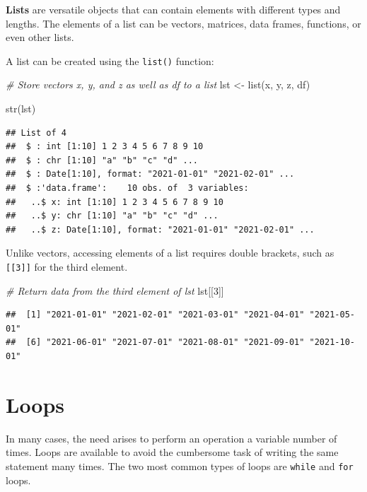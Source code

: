 \documentclass[
]{book}
\newenvironment{Shaded}{\begin{snugshade}}{\end{snugshade}}
\newcommand{\CommentTok}[1]{\textcolor[rgb]{0.56,0.35,0.01}{\textit{#1}}}
\newcommand{\DecValTok}[1]{\textcolor[rgb]{0.00,0.00,0.81}{#1}}
\newcommand{\FunctionTok}[1]{\textcolor[rgb]{0.00,0.00,0.00}{#1}}
\newcommand{\NormalTok}[1]{#1}
\newcommand{\OtherTok}[1]{\textcolor[rgb]{0.56,0.35,0.01}{#1}}
\begin{document}
\textbf{Lists} are versatile objects that can contain elements with different types and lengths. The elements of a list can be vectors, matrices, data frames, functions, or even other lists.

A list can be created using the \texttt{list()} function:

\begin{Shaded}
\begin{Highlighting}[]
\CommentTok{\# Store vectors x, y, and z as well as df to a list}
\NormalTok{lst }\OtherTok{\textless{}{-}} \FunctionTok{list}\NormalTok{(x, y, z, df)}

\FunctionTok{str}\NormalTok{(lst)}
\end{Highlighting}
\end{Shaded}

\begin{verbatim}
## List of 4
##  $ : int [1:10] 1 2 3 4 5 6 7 8 9 10
##  $ : chr [1:10] "a" "b" "c" "d" ...
##  $ : Date[1:10], format: "2021-01-01" "2021-02-01" ...
##  $ :'data.frame':    10 obs. of  3 variables:
##   ..$ x: int [1:10] 1 2 3 4 5 6 7 8 9 10
##   ..$ y: chr [1:10] "a" "b" "c" "d" ...
##   ..$ z: Date[1:10], format: "2021-01-01" "2021-02-01" ...
\end{verbatim}

Unlike vectors, accessing elements of a list requires double brackets, such as \texttt{{[}{[}3{]}{]}} for the third element.

\begin{Shaded}
\begin{Highlighting}[]
\CommentTok{\# Return data from the third element of lst}
\NormalTok{lst[[}\DecValTok{3}\NormalTok{]]}
\end{Highlighting}
\end{Shaded}

\begin{verbatim}
##  [1] "2021-01-01" "2021-02-01" "2021-03-01" "2021-04-01" "2021-05-01"
##  [6] "2021-06-01" "2021-07-01" "2021-08-01" "2021-09-01" "2021-10-01"
\end{verbatim}

\hypertarget{loops}{%
\section{Loops}\label{loops}}

In many cases, the need arises to perform an operation a variable number of times. Loops are available to avoid the cumbersome task of writing the same statement many times. The two most common types of loops are \texttt{while} and \texttt{for} loops.
\end{document}
